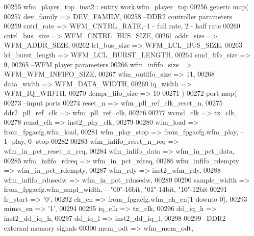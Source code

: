 \begin{DoxyCode}
00255    wfm\_player\_top\_inst2 : \textcolor{keywordflow}{entity} work.wfm_player_top
00256    \textcolor{keywordflow}{generic} \textcolor{keywordflow}{map}(
00257       dev_family        => DEV_FAMILY, 
00258 \textcolor{keyword}{      --DDR2 controller parameters}
00259       cntrl_rate        => WFM_CNTRL_RATE,\textcolor{keyword}{--1 - full rate, 2 - half rate}
00260       cntrl_bus_size    => WFM_CNTRL_BUS_SIZE,
00261       addr_size         => WFM_ADDR_SIZE,
00262       lcl_bus_size      => WFM_LCL_BUS_SIZE,
00263       lcl_burst_length  => WFM_LCL_BURST_LENGTH,
00264       cmd_fifo_size     => \textcolor{vhdllogic}{9},
00265 \textcolor{keyword}{      --WFM player parameters}
00266       wfm_infifo_size   => WFM_WFM_INFIFO_SIZE,
00267       wfm_outfifo_size  => \textcolor{vhdllogic}{11},
00268       data_width        => WFM_DATA_WIDTH,
00269       iq_width          => WFM_IQ_WIDTH,
00270       dcmpr_fifo_size   => \textcolor{vhdllogic}{10}
00271    \textcolor{vhdlchar}{)}
00272    \textcolor{keywordflow}{port} \textcolor{keywordflow}{map}(
00273 \textcolor{keyword}{      --input ports}
00274       reset_n                 => wfm_pll_ref_clk_reset_n,
00275       ddr2_pll_ref_clk        => wfm_pll_ref_clk,
00276          
00277       wcmd_clk                => tx_clk,        
00278       rcmd_clk                => inst2_phy_clk,
00279          
00280       wfm_load                => from\_fpgacfg.wfm\_load,
00281       wfm_play_stop           => from\_fpgacfg.wfm\_play,\textcolor{keyword}{ -- 1- play, 0- stop}
00282       
00283       wfm\_infifo\_reset\_n\_req  => wfm_in_pct_reset_n_req,
00284       wfm\_infifo\_data         => wfm_in_pct_data,
00285       wfm\_infifo\_rdreq        => wfm_in_pct_rdreq,
00286       wfm\_infifo\_rdempty      => wfm_in_pct_rdempty,
00287       wfm_rdy                 => inst2_wfm_rdy,
00288       wfm\_infifo\_rdusedw      => wfm_in_pct_rdusedw,
00289       
00290       sample_width            => from\_fpgacfg.wfm\_smpl\_width,\textcolor{keyword}{ -- "00"-16bit, "01"-14bit, "10"-12bit}
00291       fr_start                => '0',
00292       ch_en                   => from\_fpgacfg.wfm\_ch\_en\textcolor{vhdlchar}{(}\textcolor{vhdllogic}{1} \textcolor{keywordflow}{downto} \textcolor{vhdllogic}{0}\textcolor{vhdlchar}{)},
00293       mimo_en                 => '1',
00294       
00295       iq_clk                  => tx_clk,
00296       dd_iq_h                 => inst2_dd_iq_h,
00297       dd_iq_l                 => inst2_dd_iq_l,
00298       
00299 \textcolor{keyword}{      --DDR2 external memory signals}
00300       mem_odt                 => wfm_mem_odt,

\end{DoxyCode}
